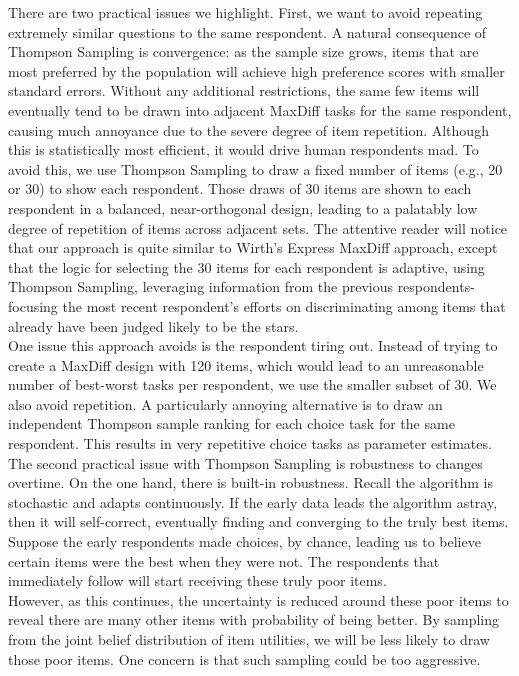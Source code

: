 \documentclass[mksc,blindrev]{informs3} %
\begin{document}
There are two practical issues we highlight. First, we want to avoid repeating extremely similar questions to the same respondent. A natural consequence of Thompson Sampling is convergence: as the sample size grows, items that are most preferred by the population will achieve high preference scores with smaller standard errors.  Without any additional restrictions, the same few items will eventually tend to be drawn into adjacent MaxDiff tasks for the same respondent, causing much annoyance due to the severe degree of item repetition.  Although this is statistically most efficient, it would drive human respondents mad.  To avoid this, we use Thompson Sampling to draw a fixed number of items (e.g., 20 or 30) to show each respondent.  Those draws of 30 items are shown to each respondent in a balanced, near-orthogonal design, leading to a palatably low degree of repetition of items across adjacent sets.  The attentive reader will notice that our approach is quite similar to Wirth’s Express MaxDiff approach, except that the logic for selecting the 30 items for each respondent is adaptive, using Thompson Sampling, leveraging information from the previous respondents-focusing the most recent respondent’s efforts on discriminating among items that already have been judged likely to be the stars.\\
One issue this approach avoids is the respondent tiring out. Instead of trying to create a MaxDiff design with 120 items, which would lead to an unreasonable number of best-worst tasks per respondent, we use the smaller subset of 30.  We also avoid repetition. A particularly annoying alternative is to draw an independent Thompson sample ranking for each choice task for the same respondent. This results in very repetitive choice tasks as parameter estimates. \\
The second practical issue with Thompson Sampling is robustness to changes overtime. On the one hand, there is built-in robustness. Recall the algorithm is stochastic and adapts continuously. If the early data leads the algorithm astray, then it will self-correct, eventually finding and converging to the truly best items. Suppose the early respondents made choices, by chance, leading us to believe certain items were the best when they were not. The respondents that immediately follow will start receiving these truly poor items. \\
However, as this continues, the uncertainty is reduced around these poor items to reveal there are many other items with probability of being better. By sampling from the joint belief distribution of item utilities, we will be less likely to draw those poor items. One concern is that such sampling could be too aggressive.\\
\end{document}
